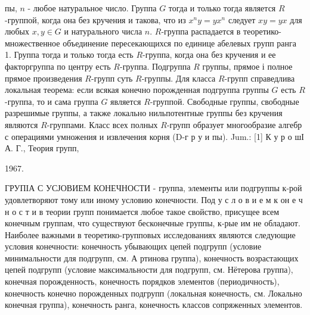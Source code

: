 \documentclass[10pt]{article}
\begin{document}
пы, $n$ - любое натуральное число. Группа $G$ тогда и только тогда является $R$-группой, когда она без кручения и такова, что из $x^{n} y=y x^{n}$ следует $x y=y x$ для любых $x, y \in G$ и натурального числа $n$. $R$-группа распадается в теоретико-множественное объединение пересекающихся по единице абелевых групп ранга 1. Группа тогда и только тогда есть $R$-группа, когда она без кручения и ее факторгруппа по центру есть $R$-группа. Подгруппа $R$ группы, прямое і полное прямое произведения $R$-групп суть $R$-группы. Для класса $R$-групп справедлива локальная теорема: если всякая конечно порожденная подгруппа группы $G$ есть $R$-группа, то и сама группа $G$ является $R$-группой. Свободные группы, свободные разрешимые группы, а также локально нильпотентные группы без кручения являются $R$-группами. Класс всех полных $R$-групп образует многообразие алгебр с операциями умножения и извлечения корня (D-г р у и пы). Jum.: [1] К у р о шІ А. Г., Теория групп,

1967.



ГРУПІА С УСЈОВИЕМ КОНЕЧНОСТИ - группа, элементы или подгруппы к-рой удовлетворяют тому или иному условию конечности. Под у с л о в и е м к он е ч н о с т и в теории групп понимается любое такое свойство, присущее всем конечным группам, что существуют бесконечные группы, к-рые им не обладают. Наиболее важными в теоретико-групповых исследованиях являются следующие условия конечности: конечность убывающих цепей подгрупп (условие минимальности для подгрупп, см. А ртинова группа), конечность возрастающих цепей подгрупп (условие максимальности для подгрупп, см. Нётерова группа), конечная порожденность, конечность порядков элементов (периодичность), конечность конечно порожденных подгрупп (локальная конечность, см. Локально конечная группа), конечность ранга, конечность классов сопряженных элементов.
\end{document}
